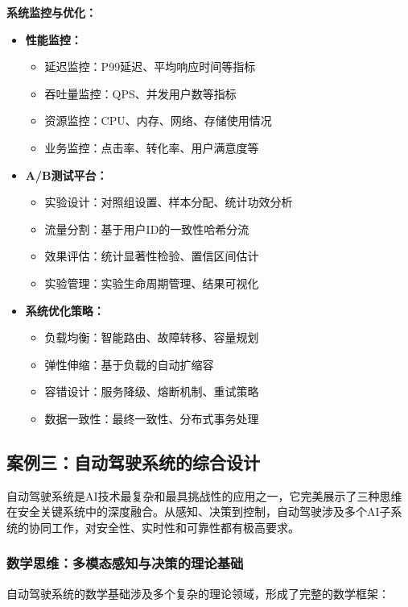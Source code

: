 \textbf{系统监控与优化：}
\begin{itemize}
\item \textbf{性能监控：}
\begin{itemize}
\item 延迟监控：P99延迟、平均响应时间等指标
\item 吞吐量监控：QPS、并发用户数等指标
\item 资源监控：CPU、内存、网络、存储使用情况
\item 业务监控：点击率、转化率、用户满意度等
\end{itemize}
\item \textbf{A/B测试平台：}
\begin{itemize}
\item 实验设计：对照组设置、样本分配、统计功效分析
\item 流量分割：基于用户ID的一致性哈希分流
\item 效果评估：统计显著性检验、置信区间估计
\item 实验管理：实验生命周期管理、结果可视化
\end{itemize}
\item \textbf{系统优化策略：}
\begin{itemize}
\item 负载均衡：智能路由、故障转移、容量规划
\item 弹性伸缩：基于负载的自动扩缩容
\item 容错设计：服务降级、熔断机制、重试策略
\item 数据一致性：最终一致性、分布式事务处理
\end{itemize}
\end{itemize}

\subsection{案例三：自动驾驶系统的综合设计}

自动驾驶系统是AI技术最复杂和最具挑战性的应用之一，它完美展示了三种思维在安全关键系统中的深度融合。从感知、决策到控制，自动驾驶涉及多个AI子系统的协同工作，对安全性、实时性和可靠性都有极高要求。

\subsubsection{数学思维：多模态感知与决策的理论基础}

自动驾驶系统的数学基础涉及多个复杂的理论领域，形成了完整的数学框架：

